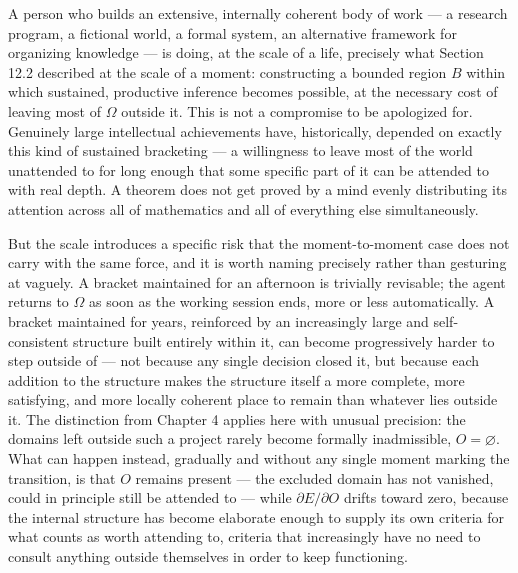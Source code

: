\documentclass[12pt,a4paper]{book}
\begin{document}
A person who builds an extensive, internally coherent body of work — a research program, a fictional world, a formal system, an alternative framework for organizing knowledge — is doing, at the scale of a life, precisely what Section 12.2 described at the scale of a moment: constructing a bounded region $B$ within which sustained, productive inference becomes possible, at the necessary cost of leaving most of $\Omega$ outside it. This is not a compromise to be apologized for. Genuinely large intellectual achievements have, historically, depended on exactly this kind of sustained bracketing — a willingness to leave most of the world unattended to for long enough that some specific part of it can be attended to with real depth. A theorem does not get proved by a mind evenly distributing its attention across all of mathematics and all of everything else simultaneously.

But the scale introduces a specific risk that the moment-to-moment case does not carry with the same force, and it is worth naming precisely rather than gesturing at vaguely. A bracket maintained for an afternoon is trivially revisable; the agent returns to $\Omega$ as soon as the working session ends, more or less automatically. A bracket maintained for years, reinforced by an increasingly large and self-consistent structure built entirely within it, can become progressively harder to step outside of — not because any single decision closed it, but because each addition to the structure makes the structure itself a more complete, more satisfying, and more locally coherent place to remain than whatever lies outside it. The distinction from Chapter 4 applies here with unusual precision: the domains left outside such a project rarely become formally inadmissible, $O = \varnothing$. What can happen instead, gradually and without any single moment marking the transition, is that $O$ remains present — the excluded domain has not vanished, could in principle still be attended to — while $\partial E/\partial O$ drifts toward zero, because the internal structure has become elaborate enough to supply its own criteria for what counts as worth attending to, criteria that increasingly have no need to consult anything outside themselves in order to keep functioning.
\end{document}
